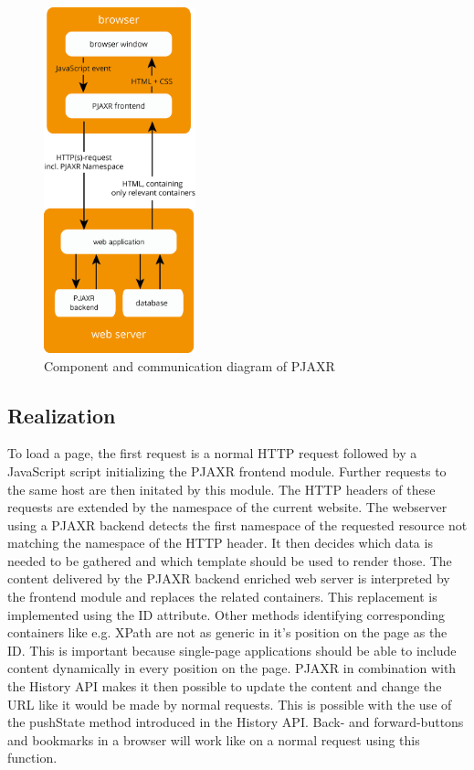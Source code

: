 \documentclass[f,bachelor,binding,twoside,palatino]{WeSTthesis}
\def \pjaxr {PJAXR}
\def \httpRequest {HTTP request}
\def \singlePageApplication {single-page application}
\begin{document}
  \begin{figure}[H]
    \centering
    \includegraphics[height=10cm]{images/pjaxr.png}
    \caption[pjaxr_components]{Component and communication diagram of \pjaxr{}}
  \end{figure}
  
  \subsection{Realization}
  To load a page, the first request is a normal \httpRequest{} followed by a JavaScript script initializing the \pjaxr{} frontend module.
  Further requests to the same host are then initated by this module.
  The HTTP headers of these requests are extended by the namespace of the current website.
  The webserver using a \pjaxr{} backend detects the first namespace of the requested resource not matching the namespace of the HTTP header.
  It then decides which data is needed to be gathered and which template should be used to render those.
  The content delivered by the \pjaxr{} backend enriched web server is interpreted by the frontend module and replaces the related containers.
  This replacement is implemented using the ID attribute.
  Other methods identifying corresponding containers like e.g. XPath are not as generic in it's position on the page as the ID.
  This is important because \singlePageApplication{}s should be able to include content dynamically in every position on the page.
  \pjaxr{} in combination with the History API makes it then possible to update the content and change the URL like it would be made by normal requests.
  This is possible with the use of the pushState method introduced in the History API.
  Back- and forward-buttons and bookmarks in a browser will work like on a normal request using this function.
  
\end{document}
